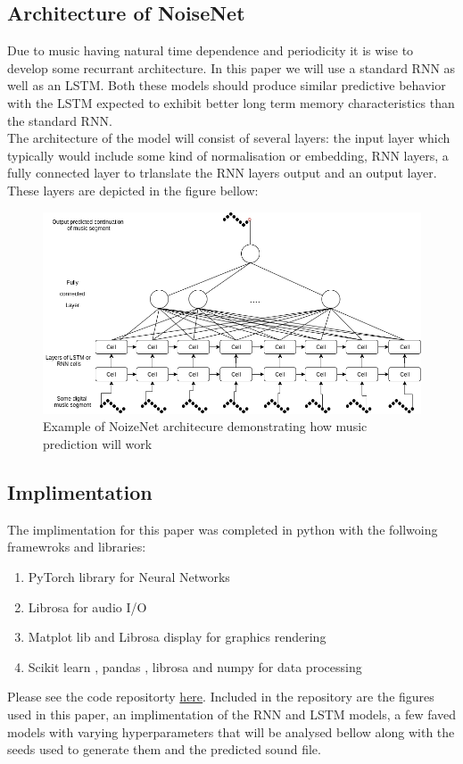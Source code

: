 \documentclass{article}
\begin{document}
\subsection{Architecture of NoiseNet}
\label{sec:arch}
Due to music having natural time dependence and periodicity it is wise to develop some recurrant architecture. In this paper we will use a standard RNN as well as an LSTM. Both these models should produce similar predictive behavior with the LSTM expected to exhibit better long term memory characteristics than the standard RNN. \\
The architecture of the model will consist of several layers: the input layer which typically would include some kind of normalisation or embedding,  RNN  layers, a fully connected layer to trlanslate the RNN layers output and an output layer. These layers are depicted in the figure bellow:
\begin{figure}[H]
\caption{Example of NoizeNet architecure demonstrating how music prediction will work}
\includegraphics[scale=0.5]{NoizeNetArch.png}
\end{figure}
\subsection{Implimentation}
\label{sec:impl}
The implimentation for this paper was completed in python with the follwoing framewroks and libraries:
\begin{enumerate}
\item PyTorch library for Neural Networks \cite{NEURIPS2019_9015}
\item Librosa for audio I/O \cite{mcfee2015librosa} 
\item Matplot lib \cite{Hunter:2007} and Librosa display \cite{mcfee2015librosa} for graphics rendering
\item Scikit learn \cite{scikit-learn}, pandas \cite{reback2020pandas} \cite{mckinney-proc-scipy-2010}, librosa \cite{mcfee2015librosa} and numpy \cite{harris2020array} for data processing \cite{fma_dataset}\cite{fma_challenge}
\end{enumerate}
Please see the code repositorty \href{https://github.com/Liam-Watson/NoizeNet}{here}. Included in the repository are the figures used in this paper, an implimentation of the RNN and LSTM models, a few faved models with varying hyperparameters that will be analysed bellow along with the seeds used to generate them and the predicted sound file. 
\end{document}
